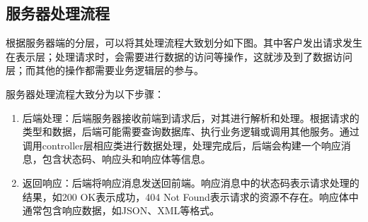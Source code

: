 \documentclass[12pt]{ctexart} %
\begin{document}
\subsection{服务器处理流程}
根据服务器端的分层，可以将其处理流程大致划分如下图。其中客户发出请求发生在表示层；处理请求时，会需要进行数据的访问等操作，这就涉及到了数据访问层；而其他的操作都需要业务逻辑层的参与。

服务器处理流程大致分为以下步骤：

\begin{enumerate}
  \item 后端处理：后端服务器接收前端到请求后，对其进行解析和处理。根据请求的类型和数据，后端可能需要查询数据库、执行业务逻辑或调用其他服务。通过调用controller层相应类进行数据处理，处理完成后，后端会构建一个响应消息，包含状态码、响应头和响应体等信息。
  \item 返回响应：后端将响应消息发送回前端。响应消息中的状态码表示请求处理的结果，如200 OK表示成功，404 Not Found表示请求的资源不存在。响应体中通常包含响应数据，如JSON、XML等格式。
\end{enumerate}
\end{document}
